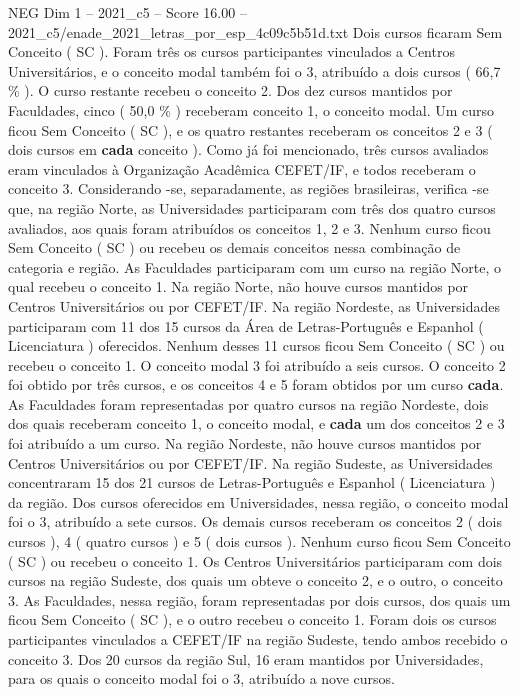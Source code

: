 \begin{textsample}{NEG Dim 1 – 2021\_c5 – Score 16.00 – 2021\_c5/enade\_2021\_letras\_por\_esp\_4c09c5b51d.txt}
Dois cursos ficaram Sem Conceito ( SC ).
Foram três os cursos participantes vinculados a Centros Universitários, e o conceito modal também foi o 3, atribuído a dois cursos ( 66,7 \% ).
O curso restante recebeu o conceito 2.
Dos dez cursos mantidos por Faculdades, cinco ( 50,0 \% ) receberam conceito 1, o conceito modal.
Um curso ficou Sem Conceito ( SC ), e os quatro restantes receberam os conceitos 2 e 3 ( dois cursos em \textbf{cada} conceito ).
Como já foi mencionado, três cursos avaliados eram vinculados à Organização Acadêmica CEFET/IF, e todos receberam o conceito 3.
Considerando -se, separadamente, as regiões brasileiras, verifica -se que, na região Norte, as Universidades participaram com três dos quatro cursos avaliados, aos quais foram atribuídos os conceitos 1, 2 e 3.
Nenhum curso ficou Sem Conceito ( SC ) ou recebeu os demais conceitos nessa combinação de categoria e região.
As Faculdades participaram com um curso na região Norte, o qual recebeu o conceito 1.
Na região Norte, não houve cursos mantidos por Centros Universitários ou por CEFET/IF.
Na região Nordeste, as Universidades participaram com 11 dos 15 cursos da Área de Letras-Português e Espanhol ( Licenciatura ) oferecidos.
Nenhum desses 11 cursos ficou Sem Conceito ( SC ) ou recebeu o conceito 1.
O conceito modal 3 foi atribuído a seis cursos.
O conceito 2 foi obtido por três cursos, e os conceitos 4 e 5 foram obtidos por um curso \textbf{cada}.
As Faculdades foram representadas por quatro cursos na região Nordeste, dois dos quais receberam conceito 1, o conceito modal, e \textbf{cada} um dos conceitos 2 e 3 foi atribuído a um curso.
Na região Nordeste, não houve cursos mantidos por Centros Universitários ou por CEFET/IF.
Na região Sudeste, as Universidades concentraram 15 dos 21 cursos de Letras-Português e Espanhol ( Licenciatura ) da região.
Dos cursos oferecidos em Universidades, nessa região, o conceito modal foi o 3, atribuído a sete cursos.
Os demais cursos receberam os conceitos 2 ( dois cursos ), 4 ( quatro cursos ) e 5 ( dois cursos ).
Nenhum curso ficou Sem Conceito ( SC ) ou recebeu o conceito 1.
Os Centros Universitários participaram com dois cursos na região Sudeste, dos quais um obteve o conceito 2, e o outro, o conceito 3.
As Faculdades, nessa região, foram representadas por dois cursos, dos quais um ficou Sem Conceito ( SC ), e o outro recebeu o conceito 1.
Foram dois os cursos participantes vinculados a CEFET/IF na região Sudeste, tendo ambos recebido o conceito 3.
Dos 20 cursos da região Sul, 16 eram mantidos por Universidades, para os quais o conceito modal foi o 3, atribuído a nove cursos.

\end{textsample}
